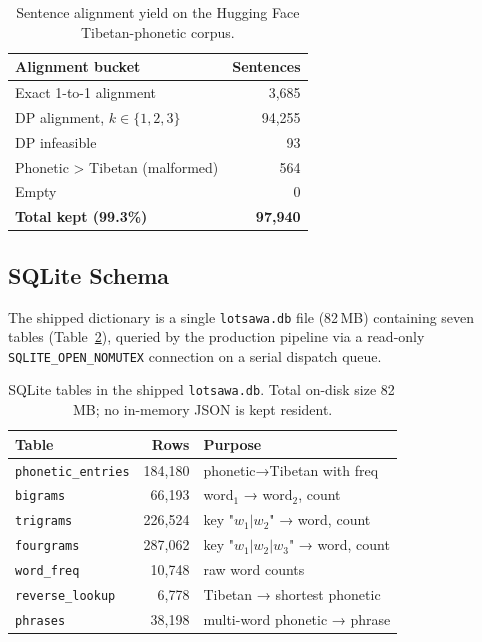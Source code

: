 \documentclass[11pt]{article}
\begin{document}
\begin{table}[t]
\centering
\small
\begin{tabular}{lr}
\toprule
Alignment bucket & Sentences \\
\midrule
Exact 1-to-1 alignment         & 3{,}685  \\
DP alignment, $k \in \{1,2,3\}$ & 94{,}255 \\
DP infeasible                  & 93      \\
Phonetic > Tibetan (malformed) & 564     \\
Empty                          & 0       \\
\midrule
\textbf{Total kept (99.3\%)}   & \textbf{97{,}940} \\
\bottomrule
\end{tabular}
\caption{Sentence alignment yield on the Hugging Face Tibetan-phonetic corpus.}
\label{tab:alignment}
\end{table}

\subsection{SQLite Schema}

The shipped dictionary is a single \texttt{lotsawa.db} file (82\,MB) containing seven tables (Table~\ref{tab:sqlite}), queried by the production pipeline via a read-only \texttt{SQLITE\_OPEN\_NOMUTEX} connection on a serial dispatch queue.

\begin{table}[t]
\centering
\small
\begin{tabular}{lrp{3.8cm}}
\toprule
Table & Rows & Purpose \\
\midrule
\texttt{phonetic\_entries} & 184{,}180 & phonetic→Tibetan with freq \\
\texttt{bigrams}           &  66{,}193 & word$_1$ → word$_2$, count \\
\texttt{trigrams}          & 226{,}524 & key "$w_1|w_2$" → word, count \\
\texttt{fourgrams}         & 287{,}062 & key "$w_1|w_2|w_3$" → word, count \\
\texttt{word\_freq}        &  10{,}748 & raw word counts \\
\texttt{reverse\_lookup}   &   6{,}778 & Tibetan → shortest phonetic \\
\texttt{phrases}           &  38{,}198 & multi-word phonetic → phrase \\
\bottomrule
\end{tabular}
\caption{SQLite tables in the shipped \texttt{lotsawa.db}. Total on-disk size 82\,MB; no in-memory JSON is kept resident.}
\label{tab:sqlite}
\end{table}
\end{document}
